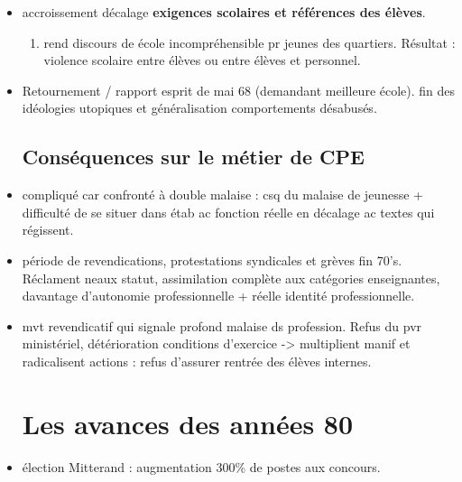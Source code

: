 \documentclass[12pt]{report}
\begin{document}
\begin{itemize}
\item accroissement décalage \textbf{exigences scolaires et références des élèves}.
\begin{enumerate}
\item rend discours de école incompréhensible pr jeunes des quartiers. Résultat : violence scolaire entre élèves ou entre élèves et personnel. \\
\end{enumerate}

\item Retournement / rapport esprit de mai 68 (demandant meilleure école). fin des idéologies utopiques et généralisation comportements désabusés. \\

\subsection{Conséquences sur le métier de CPE}

\item compliqué car confronté à double malaise : csq du malaise de jeunesse + difficulté de se situer dans étab ac fonction réelle en décalage ac textes qui régissent. \\

\item période de revendications, protestations syndicales et grèves fin 70's. Réclament neaux statut, assimilation complète aux catégories enseignantes, davantage d'autonomie professionnelle + réelle identité professionnelle. \\

\item mvt revendicatif qui signale profond malaise ds profession. Refus du pvr ministériel, détérioration conditions d'exercice -> multiplient manif et radicalisent actions : refus d'assurer rentrée des élèves internes.

\section{Les avances des années 80}

\item élection Mitterand : augmentation 300\% de postes aux concours.


\end{itemize}
\end{document}
